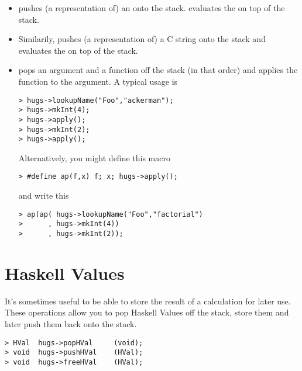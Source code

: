 \begin{itemize}
\item
   pushes (a representation of) an  onto
  the stack.
   evaluates the  on top of the stack.

\item
  Similarily,  pushes (a representation of) a
  C string onto the stack and
   evaluates the  on top of the stack.

\item
   pops an argument and a function off the stack (in that
  order) and applies the function to the argument.  A typical usage
  is
\begin{verbatim}
> hugs->lookupName("Foo","ackerman");
> hugs->mkInt(4);
> hugs->apply();
> hugs->mkInt(2);
> hugs->apply();
\end{verbatim}

  Alternatively, you might define this macro
\begin{verbatim}
> #define ap(f,x) f; x; hugs->apply();
\end{verbatim}
  and write this
\begin{verbatim}
> ap(ap( hugs->lookupName("Foo","factorial")
>      , hugs->mkInt(4))
>      , hugs->mkInt(2));
\end{verbatim}

\end{itemize}


\section{Haskell Values}

It's sometimes useful to be able to store the result of a calculation
for later use.  These operations allow you to pop Haskell Values
off the stack, store them and later push them back onto the stack.

\begin{verbatim}
> HVal  hugs->popHVal     (void);     
> void  hugs->pushHVal    (HVal);     
> void  hugs->freeHVal    (HVal); 
\end{verbatim}

